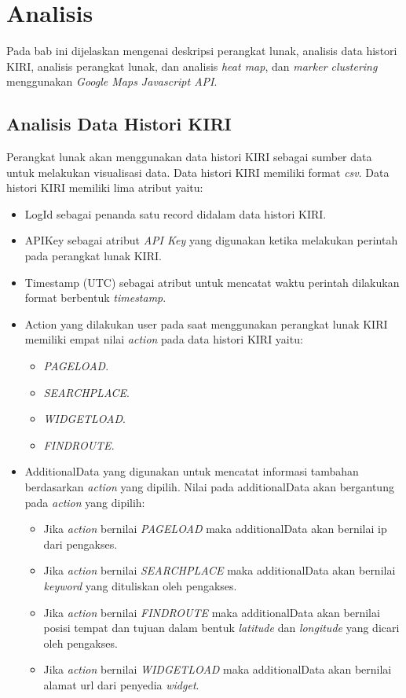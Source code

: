 \chapter{Analisis}
\label{chap:analisis}
Pada bab ini dijelaskan mengenai deskripsi perangkat lunak, analisis data histori KIRI, analisis perangkat lunak, dan analisis \textit{heat map}, dan \textit{marker clustering} menggunakan  \textit{Google Maps Javascript API}.


\section{Analisis Data Histori KIRI}
\label{sec:analisisDataHistoriKiri}
Perangkat lunak  akan menggunakan data histori KIRI sebagai sumber data untuk melakukan visualisasi data. Data histori KIRI memiliki format \textit{csv}. Data histori KIRI memiliki lima atribut yaitu:
\begin{itemize}
    \item LogId    sebagai penanda satu record didalam data histori KIRI.
    \item APIKey
    sebagai  atribut \textit{API Key} yang digunakan ketika melakukan perintah pada perangkat lunak KIRI.
    \item Timestamp (UTC) sebagai atribut untuk mencatat waktu perintah dilakukan format berbentuk \textit{timestamp}.
    \item Action yang dilakukan user pada saat menggunakan perangkat lunak KIRI memiliki empat nilai  \textit{action} pada data histori KIRI yaitu:
    \begin{itemize}
        \item \textit{PAGELOAD}.
        \item \textit{SEARCHPLACE}.
        \item \textit{WIDGETLOAD}.
        \item \textit{FINDROUTE}.
    \end{itemize}
    \item AdditionalData yang digunakan untuk mencatat informasi tambahan berdasarkan  \textit{action} yang dipilih. Nilai pada additionalData akan bergantung pada \textit{ \textit{action}} yang dipilih:
    \begin{itemize}
        \item Jika  \textit{action} bernilai \textit{PAGELOAD} maka additionalData akan bernilai ip dari pengakses.
        \item Jika  \textit{action} bernilai \textit{SEARCHPLACE} maka additionalData akan bernilai \textit{keyword} yang dituliskan oleh pengakses.
        \item Jika  \textit{action} bernilai \textit{FINDROUTE} maka additionalData akan bernilai posisi tempat dan tujuan dalam bentuk \textit{latitude} dan \textit{longitude}  yang dicari oleh pengakses.
        \item Jika  \textit{action} bernilai \textit{WIDGETLOAD} maka additionalData akan bernilai alamat url dari penyedia \textit{widget}.
    \end{itemize}
\end{itemize}



